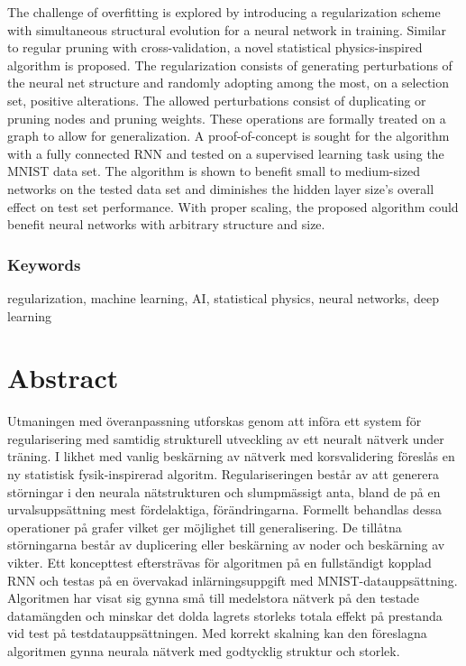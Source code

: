 The challenge of overfitting is explored by introducing a regularization scheme with simultaneous structural evolution for a neural network in training. Similar to regular pruning with cross-validation, a novel statistical physics-inspired algorithm is proposed. The regularization consists of generating perturbations of the neural net structure and randomly adopting among the most, on a selection set, positive alterations. The allowed perturbations consist of duplicating or pruning nodes and pruning weights. These operations are formally treated on a graph to allow for generalization. A proof-of-concept is sought for the algorithm with a fully connected RNN and tested on a supervised learning task using the MNIST data set. The algorithm is shown to benefit small to medium-sized networks on the tested data set and diminishes the hidden layer size's overall effect on test set performance. With proper scaling, the proposed algorithm could benefit neural networks with arbitrary structure and size.


\subsection*{Keywords}
regularization, machine learning, AI, statistical physics, neural networks, deep learning


\newpage
\thispagestyle{plain}
\chapter*{Abstract}
Utmaningen med överanpassning utforskas genom att införa ett system för regularisering med samtidig strukturell utveckling av ett neuralt nätverk under träning. I likhet med vanlig beskärning av nätverk med korsvalidering föreslås en ny statistisk fysik-inspirerad algoritm. Regulariseringen består av att generera störningar i den neurala nätstrukturen och slumpmässigt anta, bland de på en urvalsuppsättning mest fördelaktiga, förändringarna. Formellt behandlas dessa operationer på grafer vilket ger möjlighet till generalisering. De tillåtna störningarna består av duplicering eller beskärning av noder och beskärning av vikter. Ett koncepttest eftersträvas för algoritmen på en fullständigt kopplad RNN och testas på en övervakad inlärningsuppgift med MNIST-datauppsättning. Algoritmen har visat sig gynna små till medelstora nätverk på den testade datamängden och minskar det dolda lagrets storleks totala effekt på prestanda vid test på testdatauppsättningen. Med korrekt skalning kan den föreslagna algoritmen gynna neurala nätverk med godtycklig struktur och storlek.

